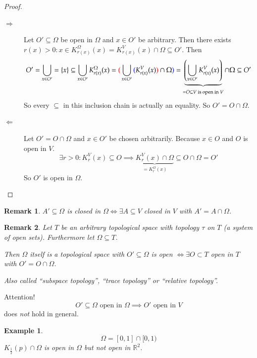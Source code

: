 \documentclass{article}
\newtheorem{example}{Example}  \numberwithin{example}{section}
\newtheorem{remark}{Remark}  \numberwithin{remark}{section}
\newcommand{\set}[1]{\left\{#1\right\}}
\begin{document}
\begin{proof}
  \begin{description}
    \item[$\Rightarrow$]
      Let $O' \subseteq \Omega$ be open in $\Omega$ and $x \in O'$ be arbitrary.
      Then there exists $r(x) > 0: x \in K_{r(x)}^\Omega(x) = K_{r(x)}^V(x) \cap \Omega \subseteq O'$.
      Then
      \[
        O' = \bigcup_{x \in O'} = \set{x} \subseteq \bigcup_{x \in O'} K_{r(x)}^\Omega(x)
        = {\color{red} (}\bigcup_{x \in O'} {\color{blue} (}K_{r(x)}^V(x){\color{red} )} \cap \Omega{\color{blue} )}
        = \underbrace{\left(\bigcup_{x \in O'} K_{r(x)}^V(x)\right)}_{= O \subseteq V \text{ is open in } V} \cap \Omega
        \subseteq O'
      \]
      So every $\subseteq$ in this inclusion chain is actually an equality. So $O' = O \cap \Omega$.

    \item[$\Leftarrow$]
      Let $O' = O \cap \Omega$ and $x \in O'$ be chosen arbitrarily.
      Because $x \in O$ and $O$ is open in $V$.
      \[ \exists r > 0: K_r^V(x) \subseteq O \implies \underbrace{K_r^V(x) \cap \Omega}_{= K_r^\Omega(x)} \subseteq O \cap \Omega = O' \]
      So $O'$ is open in $\Omega$.
  \end{description}
\end{proof}

\begin{remark}
  $A' \subseteq \Omega$ is closed in $\Omega \iff \exists A \subseteq V$ closed in $V$ with $A' = A \cap \Omega$.
\end{remark}

\begin{remark}
  Let $T$ be an arbitrary topological space with topology $\tau$ on $T$ (a system of open sets).
  Furthermore let $\Omega \subseteq T$.

  Then $\Omega$ itself is a topological space with $O' \subseteq \Omega$ is open $\iff \exists O \subset T$ open in $T$ with $O' = O \cap \Omega$.

  Also called \enquote{subspace topology}, \enquote{trace topology} or \enquote{relative topology}.
\end{remark}

Attention!
\[ O' \subseteq \Omega \text{ open in } \Omega \implies O' \text{ open in } V \]
does \emph{not} hold in general.

\begin{example}
  \[ \Omega = [0,1] \cap [0,1) \]
  $K_{\frac12}(p) \cap \Omega$ is open in $\Omega$ but not open in $\mathbb R^2$.
\end{example}
\end{document}
